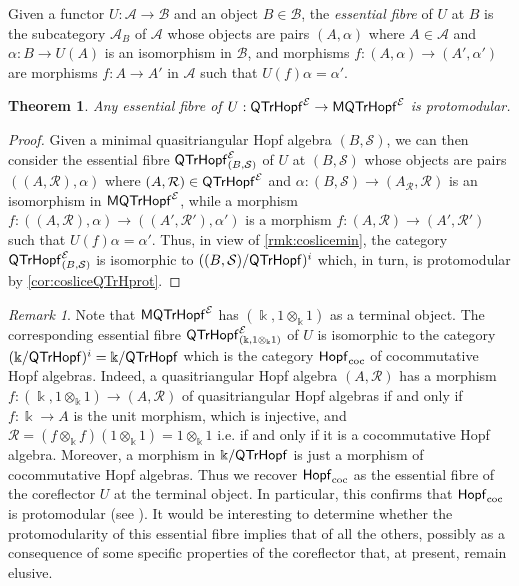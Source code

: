 \documentclass[nosumlimits,twoside]{amsart}
\newtheorem{theorem}{\sc Theorem}[section]
\theoremstyle{definition}
\theoremstyle{remark}
\newtheorem{remark}[remark]{\sc Remark}
\newcommand{\Bb}{\mathcal{B}}
\newcommand{\Rr}{\mathcal{R}}
\newcommand{\Ss}{\mathcal{S}}
\def\cHopf{{\sf Hopf}_{\mathrm{coc}}}
\def\QTrHopf{{\sf QTrHopf}}
\def\MQTrHopf{{\sf MQTrHopf}}
\begin{document}
Given a functor $U:\mathcal{A}\to \mathcal{B}$ and an object $B\in \mathcal{B}$, the \emph{essential fibre} of $U$ at $B$ is the subcategory $\mathcal{A}_B$ of $\mathcal{A}$ whose objects are pairs $(A,\alpha)$ where $A\in \mathcal{A}$ and $\alpha:B\to U(A)$ is an isomorphism in $\Bb$, and morphisms $f:(A,\alpha)\to (A',\alpha')$ are morphisms $f:A\to A'$ in $ \mathcal{A}$ such that $U(f)\alpha=\alpha'$.

\begin{theorem}\label{thm:protomodularityforfibre}
Any essential fibre of
$U:\QTrHopf^\mathcal{E}\to \MQTrHopf^\mathcal{E}$ is protomodular.
\end{theorem}

\begin{proof}
Given a minimal quasitriangular Hopf algebra $(B,\Ss)$, we can then consider the essential fibre $\QTrHopf^\mathcal{E}_{(B,\Ss)}$ of $U$ at $(B,\Ss)$ whose objects are pairs $((A,\Rr),\alpha)$ where $(A,\Rr)\in \QTrHopf^\mathcal{E}$ and $\alpha :(B,\Ss)\to (A_{\Rr},\Rr)$ is an isomorphism in $\MQTrHopf^\mathcal{E}$, while a morphism $f:((A,\Rr),\alpha)\to ((A',\Rr'),\alpha')$ is a morphism $f:(A,\Rr)\to (A',\Rr')$
such that $U(f)\alpha=\alpha'.$ Thus, in view of \cref{rmk:coslicemin}, the category $\QTrHopf^\mathcal{E}_{(B,\Ss)}$ is isomorphic to $ ((B,\Ss)/\QTrHopf)^i$ which, in turn, is protomodular by \cref{cor:cosliceQTrHprot}.
\end{proof}

\begin{remark}
Note that $\MQTrHopf^\mathcal{E}$ has $(\Bbbk,1\otimes_\Bbbk1)$ as a terminal object. The corresponding essential fibre $\QTrHopf^\mathcal{E}_{(\Bbbk,1\otimes_\Bbbk1)}$ of $U$ is isomorphic to the category $ (\Bbbk/\QTrHopf)^i=\Bbbk/\QTrHopf$ which is the category
$\cHopf$ of cocommutative Hopf algebras. Indeed, a quasitriangular Hopf algebra $(A,\Rr)$ has a morphism $f:(\Bbbk,1\otimes_\Bbbk1)\to (A,\Rr)$ of quasitriangular Hopf algebras if and only if $f:\Bbbk\to A$ is the unit morphism, which is injective, and $\Rr=(f\otimes_\Bbbk f)(1\otimes_\Bbbk1)=1\otimes_\Bbbk1$ i.e. if and only if it is a cocommutative Hopf algebra. Moreover, a morphism in $\Bbbk/\QTrHopf$ is just a morphism of cocommutative Hopf algebras. Thus we recover $\cHopf$ as the essential fibre of the coreflector $U$ at the terminal object. In particular, this confirms that $\cHopf$ is protomodular (see \cite{GrStVe}). It would be interesting to determine whether the protomodularity of this essential fibre implies that of all the others, possibly as a consequence of some specific properties of the coreflector that, at present, remain elusive.
\end{remark}
\end{document}
